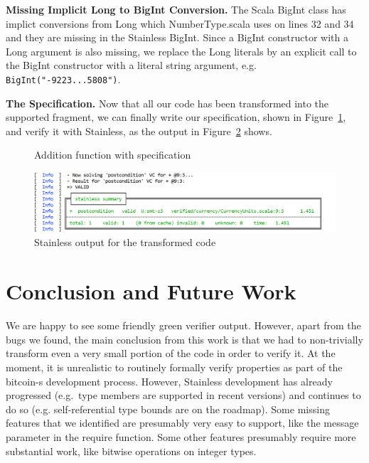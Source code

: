 \documentclass[runningheads]{llncs}
\renewcommand{\paragraph}{\textbf}%
\begin{document}
\paragraph{Missing Implicit Long to BigInt Conversion.} The Scala
BigInt class has implict conversions from Long which NumberType.scala
uses on lines 32 and 34 and they are missing in the Stainless
BigInt. Since a BigInt constructor with a Long argument is also
missing, we replace the Long literals by an explicit call to the
BigInt constructor with a literal string argument,
e.g. \texttt{BigInt("-9223...5808")}.


\paragraph{The Specification.} Now that all our code has been
transformed into the supported fragment, we can finally write our
specification, shown in Figure~\ref{fig:spec}, and verify it with
Stainless, as the output in Figure~\ref{fig:result} shows.

\begin{figure}

\caption{Addition function with specification}
\label{fig:spec}
\end{figure}

\begin{figure}
	\centering
		\includegraphics[width=\textwidth]{result_output}
	\caption{Stainless output for the transformed code}
  \label{fig:result}
\end{figure}


\section{Conclusion and Future Work}

We are happy to see some friendly green verifier output. However,
apart from the bugs we found, the main conclusion from this work is
that we had to non-trivially transform even a very small portion of
the code in order to verify it. At the moment, it is unrealistic to
routinely formally verify properties as part of the bitcoin-s
development process. However, Stainless development has already
progressed (e.g.\ type members are supported in recent versions) and
continues to do so (e.g. self-referential type bounds are on the
roadmap). Some missing features that we identified are presumably very
easy to support, like the message parameter in the require
function. Some other features presumably require more substantial
work, like bitwise operations on integer types.
\end{document}
